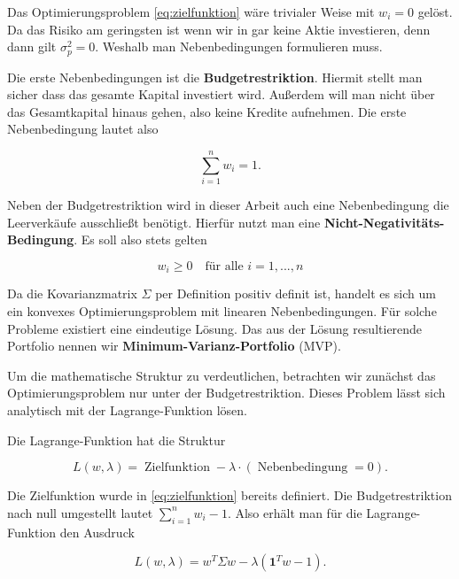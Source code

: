 \documentclass[parskip=half]{scrartcl}
\begin{document}
	\clearpage
	
	Das Optimierungsproblem \eqref{eq:zielfunktion} wäre trivialer Weise mit $w_i = 0$ gelöst. Da das Risiko am geringsten ist wenn wir in gar keine Aktie investieren, denn dann gilt $\sigma_p^2 = 0$. Weshalb man Nebenbedingungen formulieren muss.
	
	Die erste Nebenbedingungen ist die \textbf{Budgetrestriktion}. Hiermit stellt man sicher dass das gesamte Kapital investiert wird. Außerdem will man nicht über das Gesamtkapital hinaus gehen, also keine Kredite aufnehmen. Die erste Nebenbedingung lautet also
	
	\begin{equation}
		\sum_{i=1}^{n} w_i = 1 . \label{eq:budgetrestriktion}
	\end{equation}
	
	Neben der Budgetrestriktion wird in dieser Arbeit auch eine Nebenbedingung die Leerverkäufe ausschließt benötigt. Hierfür nutzt man eine \textbf{Nicht-Negativitäts-Bedingung}. Es soll also stets gelten
	
	\begin{equation}
		w_i \geq 0 \quad \text{für alle } i = 1, ..., n \label{eq:nicht-negativ}
	\end{equation}
	
	Da die Kovarianzmatrix $\Sigma$ per Definition positiv definit ist, handelt es sich um ein konvexes Optimierungsproblem mit linearen Nebenbedingungen. Für solche Probleme existiert eine eindeutige Lösung. Das aus der Lösung resultierende Portfolio nennen wir \textbf{Minimum-Varianz-Portfolio} (MVP).
	
	Um die mathematische Struktur zu verdeutlichen, betrachten wir zunächst das Optimierungsproblem nur unter der Budgetrestriktion. Dieses Problem lässt sich analytisch mit der Lagrange-Funktion lösen.
	
	Die Lagrange-Funktion hat die Struktur
	
	\begin{equation}
		L(w,\lambda) = \operatorname{Zielfunktion} - \lambda \cdot (\operatorname{Nebenbedingung} = 0) . \label{eq:lagrange}
	\end{equation}
	
	Die Zielfunktion wurde in \eqref{eq:zielfunktion} bereits definiert. Die Budgetrestriktion nach null umgestellt lautet $\sum_{i=1}^{n} w_i - 1$. Also erhält man für die Lagrange-Funktion den Ausdruck
	
	\begin{equation*}
		L(w,\lambda) = w^T \Sigma w - \lambda (\mathbf{1}^T w-1) .
	\end{equation*}
	
\end{document}
